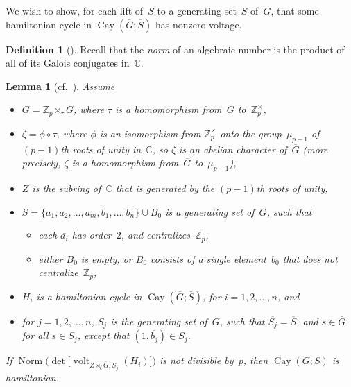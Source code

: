 \documentclass[]{amcjoucc}
\makeatletter
\theoremstyle{plain}
\newtheorem{lem}[equation]{Lemma}
\theoremstyle{definition}
\newtheorem{defn}[equation]{Definition}
\theoremstyle{definition}
\DeclareMathOperator{\Cay}{Cay}
\DeclareMathOperator{\norm}{Norm}
\DeclareMathOperator{\volt}{volt}
\newcommand{\quot}{\overline}
\newcommand{\CC}{\mathbb{C}}
\newcommand{\ZZ}{\mathbb{Z}}
\newcommand{\noprelistbreak}{\smallskip\@nobreaktrue\nopagebreak}
\makeatother
\begin{document}
We wish to show, for each lift of~$\quot S$ to a generating set~$S$ of~$G$, that some hamiltonian cycle in $\Cay(\quot G; \quot S)$ has nonzero voltage.

\begin{defn}[\cite{Wikipedia-norm}]
Recall that the \emph{norm} of an algebraic number is the product of all of its Galois conjugates in~$\CC$.
\end{defn}

\begin{lem}[{cf.\, \cite[Lem.~2.11]{Morris-nonsolvable}}] \label{VoltageMatrix}
Assume 
\noprelistbreak
	\begin{itemize}
	\item $G = \ZZ_p \rtimes_\tau \quot G$, where $\tau$ is a homomorphism from~$\quot G$ to~$ \ZZ_p^\times$,
	\item $\zeta = \phi \circ \tau$, where $\phi$ is an isomorphism from $\ZZ_p^\times$ onto the group~$\mu_{p-1}$ of $(p-1)$th roots of unity in~$\CC$, so $\zeta$ is an abelian character of~$\quot G$ \textup(more precisely, $\zeta$ is a homomorphism from~$\quot G$ to~$\mu_{p-1}$\textup),
	\item $Z$ is the subring of~$\CC$ that is generated by the $(p-1)$th roots of unity,
	\item $S = \{a_1,a_2,\ldots, a_m, b_1,\ldots,b_n\} \cup B_0$ is a generating set of~$G$,
		such that
		\begin{itemize}
			\item each $\quot{a_i}$ has order~$2$, and centralizes~$\ZZ_p$,
			\item either $B_0$ is empty, or $B_0$ consists of a single element~$b_0$ that does not centralize~$\ZZ_p$,
		\end{itemize}
	\item $H_i$ is a hamiltonian cycle in $\Cay(\quot G; \quot S)$, for $i = 1,2,\ldots,n$,
	and
	\item for $j = 1,2,\ldots,n$, $S_j$ is the generating set of~$G$, such that $\quot{S_j} = \quot S$, and $s \in \quot G$ for all $s \in S_j$, except that $(1, \quot{b_j}) \in S_j$.
	\end{itemize}
If\/ $\norm \bigl( \det \bigl[ \volt_{Z \rtimes_\zeta \quot G, S_j}(H_i) \bigr] \bigr)$ is not divisible by~$p$, then\/ $\Cay(G;S)$ is hamiltonian.
\end{lem}
\end{document}
